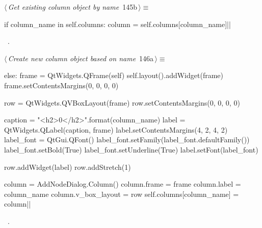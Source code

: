 \documentclass[%
    a4paper,    %
    justified,  %
    nobib,      %
    openany     %
]{tufte-book}
\begin{document}
%
\begin{flushleft} \small
\begin{minipage}{\linewidth}\label{scrap158}\raggedright\small
{} $\langle\,${\itshape Get existing column object by name}\nobreak\ {\footnotesize {145b}}$\,\rangle\equiv$
\vspace{-1ex}
\begin{pythoncode}
if column_name in self.columns:
    column = self.columns[column_name]|\NWsep|
\end{pythoncode}
\vspace{1.5ex}
\footnotesize
\begin{list}{}{\setlength{\itemsep}{-\parsep}\setlength{\itemindent}{-\leftmargin}}
\item \NWtxtMacroRefIn\ .

\item{}
\end{list}
\end{minipage}\vspace{4ex}
\end{flushleft}
%
\begin{flushleft} \small
\begin{minipage}{\linewidth}\label{scrap159}\raggedright\small
{} $\langle\,${\itshape Create new column object based on name}\nobreak\ {\footnotesize {146a}}$\,\rangle\equiv$
\vspace{-1ex}
\begin{pythoncode}
else:
    frame = QtWidgets.QFrame(self)
    self.layout().addWidget(frame)
    frame.setContentsMargins(0, 0, 0, 0)

    row = QtWidgets.QVBoxLayout(frame)
    row.setContentsMargins(0, 0, 0, 0)

    caption = "<h2>{0}</h2>".format(column_name)
    label = QtWidgets.QLabel(caption, frame)
    label.setContentsMargins(4, 2, 4, 2)
    label_font = QtGui.QFont()
    label_font.setFamily(label_font.defaultFamily())
    label_font.setBold(True)
    label_font.setUnderline(True)
    label.setFont(label_font)

    row.addWidget(label)
    row.addStretch(1)

    column = AddNodeDialog.Column()
    column.frame = frame
    column.label = column_name
    column.v_box_layout = row
    self.columns[column_name] = column|\NWsep|
\end{pythoncode}
\vspace{1.5ex}
\footnotesize
\begin{list}{}{\setlength{\itemsep}{-\parsep}\setlength{\itemindent}{-\leftmargin}}
\item \NWtxtMacroRefIn\ .

\item{}
\end{list}
\end{minipage}\vspace{4ex}
\end{flushleft}
\end{document}
